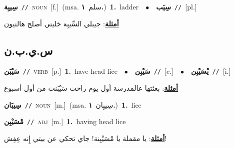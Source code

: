 \documentclass[10pt,a4paper,twoside]{article} %
\begin{document}
\begin{multicols}{2}
{\setlength\topsep{0pt}\textbf{\foreignlanguage{arabic}{سِيبِة}}\ {\color{gray}\texttt{//}\color{black}}\ \textsc{noun}\ [f.]\ \color{gray}(msa. \foreignlanguage{arabic}{سلم}~\foreignlanguage{arabic}{\textbf{١.}})\color{black}\ \textbf{1.}~ladder\ \ $\bullet$\ \ \setlength\topsep{0pt}\textbf{\foreignlanguage{arabic}{سِيَب}}\ {\color{gray}\texttt{//}\color{black}}\ [pl.]\  \begin{flushright}\color{gray}\foreignlanguage{arabic}{\textbf{\underline{\foreignlanguage{arabic}{أمثلة}}}: جيبلي السِّيبِة خليني أصلح هالنيون}\end{flushright}\color{black}} \vspace{2mm}

\vspace{-3mm}
\subsection*{\color{blue}\foreignlanguage{arabic}{س.ي.ب.ن}\color{blue}{}} 

{\setlength\topsep{0pt}\textbf{\foreignlanguage{arabic}{سَيْبَن}}\ {\color{gray}\texttt{//}\color{black}}\ \textsc{verb}\ [p.]\ \textbf{1.}~have head lice\ \ $\bullet$\ \ \setlength\topsep{0pt}\textbf{\foreignlanguage{arabic}{سَيْبِن}}\ {\color{gray}\texttt{//}\color{black}}\ [c.]\ \ $\bullet$\ \ \setlength\topsep{0pt}\textbf{\foreignlanguage{arabic}{يْسَيْبِن}}\ {\color{gray}\texttt{//}\color{black}}\ [i.]\  \begin{flushright}\color{gray}\foreignlanguage{arabic}{\textbf{\underline{\foreignlanguage{arabic}{أمثلة}}}: بعثتها عالمدرسة أول يوم راحت سَيْبَنت من أول أسبوع}\end{flushright}\color{black}} \vspace{2mm}

{\setlength\topsep{0pt}\textbf{\foreignlanguage{arabic}{سِيبَان}}\ {\color{gray}\texttt{//}\color{black}}\ \textsc{noun}\ [m.]\ \color{gray}(msa. \foreignlanguage{arabic}{سِيبِان}~\foreignlanguage{arabic}{\textbf{١.}})\color{black}\ \textbf{1.}~lice\ } \vspace{2mm}

{\setlength\topsep{0pt}\textbf{\foreignlanguage{arabic}{مْسَيْبِن}}\ {\color{gray}\texttt{//}\color{black}}\ \textsc{adj}\ [m.]\ \textbf{1.}~having head lice\  \begin{flushright}\color{gray}\foreignlanguage{arabic}{\textbf{\underline{\foreignlanguage{arabic}{أمثلة}}}: يا مقملة يا مْسَيْبِنة! جاي تحكي عن بيتي إِنه عِفِش!}\end{flushright}\color{black}} \vspace{2mm}


\end{multicols}
\end{document}
